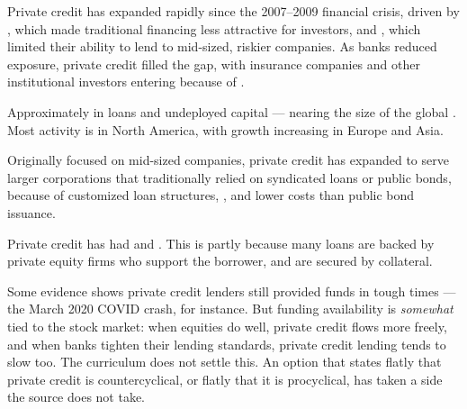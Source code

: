 
Private credit has expanded rapidly since the 2007--2009 financial crisis, driven
by , which made traditional financing less attractive for
investors, and , which limited their ability
to lend to mid-sized, riskier companies. As banks reduced exposure, private credit
filled the gap, with insurance companies and other institutional investors
entering because of .

\begin{imkeybox}[title={The size, as of 2023}]
Approximately  in loans and undeployed capital --- nearing
the size of the global . Most activity is in North
America, with growth increasing in Europe and Asia.
\end{imkeybox}

Originally focused on mid-sized companies, private credit has expanded to serve
larger corporations that traditionally relied on syndicated loans or public bonds,
because of customized loan structures, , and
lower costs than public bond issuance.

\begin{imkeybox}[title={Historical returns}]
Private credit has had  and
. This is partly because many loans are
backed by private equity firms who support the borrower, and are secured by
collateral.
\end{imkeybox}

\begin{imtrapbox}[breakable=false,title={Is it cyclical? The evidence cuts both ways}]
Some evidence shows private credit lenders still provided funds in tough times ---
the March 2020 COVID crash, for instance. But funding availability is
\emph{somewhat} tied to the stock market: when equities do well, private credit
flows more freely, and when banks tighten their lending standards, private credit
lending tends to slow too. The curriculum does not settle this. An option that
states flatly that private credit is countercyclical, or flatly that it is
procyclical, has taken a side the source does not take.
\end{imtrapbox}

